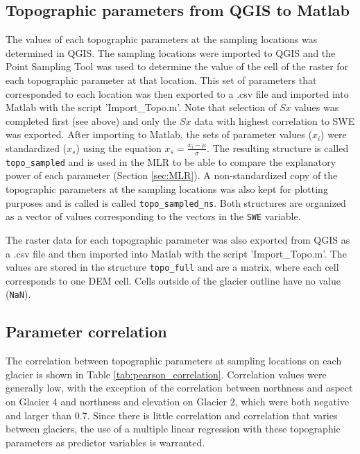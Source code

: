 \documentclass[12pt]{article}
\begin{document}
\subsection{Topographic parameters from QGIS to Matlab}

The values of each topographic parameters at the sampling locations was determined in QGIS. The sampling locations were imported to QGIS and the Point Sampling Tool was used to determine the value of the cell of the raster for each topographic parameter at that location. This set of parameters that corresponded to each location was then exported to a .csv file and imported into Matlab with the script 'Import\_Topo.m'.  Note that selection of $Sx$ values was completed first (see above) and only the $Sx$ data with highest correlation to SWE was exported. After importing to Matlab, the sets of parameter values ($x_i$) were standardized ($x_s$) using the equation $x_s = \frac{x_i-\mu}{\sigma}$. The resulting structure is called \texttt{topo\_sampled} and is used in the MLR to be able to compare the explanatory power of each parameter (Section \ref{sec:MLR}). A non-standardized copy of the topographic parameters at the sampling locations was also kept for plotting purposes and is called is called \texttt{topo\_sampled\_ns}. Both structures are organized as a vector of values corresponding to the vectors in the \texttt{SWE} variable. 

The raster data for each topographic parameter was also exported from QGIS as a .csv file and then imported into Matlab with the script 'Import\_Topo.m'. The values are stored in the structure \texttt{topo\_full} and are a matrix, where each cell corresponds to one DEM cell. Cells outside of the glacier outline have no value (\texttt{NaN}).

\subsection{Parameter correlation}

The correlation between topographic parameters at sampling locations on each glacier is shown in Table \ref{tab:pearson_correlation}. Correlation values were generally low, with the exception of the correlation between northness and aspect on Glacier 4 and northness and elevation on Glacier 2, which were both negative and larger than 0.7. Since there is little correlation and correlation that varies between glaciers, the use of a multiple linear regression with these topographic parameters as predictor variables is warranted. 
\end{document}
